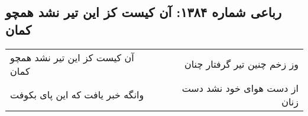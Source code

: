 \begin{center}
\section*{رباعی شماره ۱۳۸۴: آن کیست کز این تیر نشد همچو کمان}
\label{sec:1384}
\begin{longtable}{l p{0.5cm} r}
آن کیست کز این تیر نشد همچو کمان
&&
وز زخم چنین تیر گرفتار چنان
\\
وانگه خبر یافت که این پای بکوفت
&&
از دست هوای خود نشد دست زنان
\\
\end{longtable}
\end{center}

